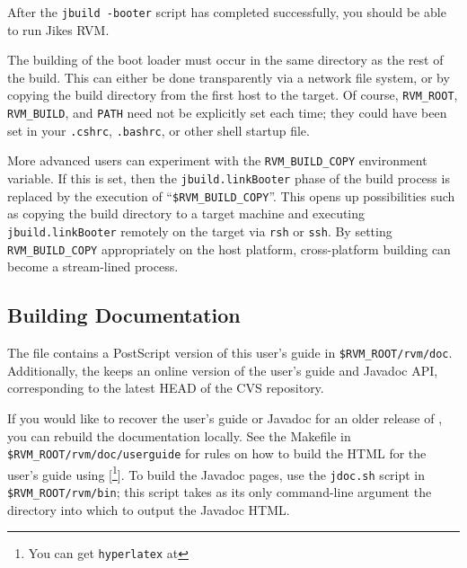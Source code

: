 After the \texttt{jbuild -booter} script has completed successfully, you should be able 
to run Jikes RVM.\@ 

The building of the boot loader must occur in the same directory as
the rest of the build.  This can either be done transparently via a
network file system, or by copying the build directory from the first
host to the target.  Of course, \texttt{RVM\_\-ROOT}, \texttt{RVM\-\_\-BUILD},
and \texttt{PATH} need not be explicitly set each time; they could
have been set in your \texttt{.cshrc}, \texttt{.bashrc}, or other
shell startup file. 

More advanced users can experiment with the \texttt{RVM\_BUILD\_COPY}
environment variable.  If this is set, then the 
\texttt{jbuild.linkBooter} phase of the build process is replaced by the
execution of ``\texttt{\$RVM\-\_\-BUILD\_COPY}''.  This opens up 
possibilities such as copying the build directory to a target
machine and executing \texttt{jbuild.linkBooter} remotely on the target
via \texttt{rsh} or \texttt{ssh}.  By setting \texttt{RVM\_BUILD\_COPY}
appropriately on the host platform, cross-platform building can become
a stream-lined process.

\subsection{Building Documentation}

The \texttt{\RVMTarFile} file contains a PostScript\Rweb{} version of this user's guide
in \texttt{\$RVM\_\-ROOT/rvm/doc}.  Additionally, the 
 keeps an online version of
the user's guide and Javadoc\TMweb{} API, corresponding to the latest HEAD of the CVS
repository.

If you would like to recover the user's guide or Javadoc for an older release
of \jrvm{}, you can rebuild the documentation locally.  See the Makefile in
\texttt{\$RVM\_\-ROOT/rvm/doc/userguide} for rules on how to build the
HTML for the user's guide using
[\footnote{You can get \texttt{hyperlatex}
    at \texttt{\HyperlatexURL}}]{\HyperlatexURL}.  To build the
Javadoc pages, use 
the \texttt{jdoc.sh} script in \texttt{\$RVM\_\-ROOT/rvm/bin}; this
script takes as its only command-line argument the directory into
which to output the Javadoc HTML.\@ 

